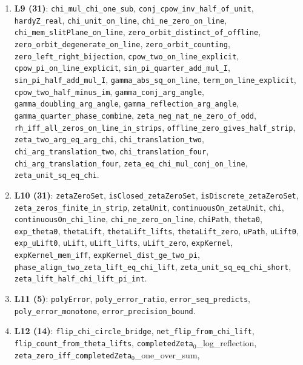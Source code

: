 \documentclass{article}
\begin{document}
{\begin{sloppypar}
\begin{enumerate}
\texttt{recip\_on\_critical\_circle\_iff}, \texttt{zero\_orbit\_four}.
\item \textbf{L9 (31)}: \texttt{chi\_mul\_chi\_one\_sub},
\texttt{conj\_cpow\_inv\_half\_of\_unit}, \texttt{hardyZ\_real},
\texttt{chi\_unit\_on\_line}, \texttt{chi\_ne\_zero\_on\_line},
\texttt{chi\_mem\_slitPlane\_on\_line}, \texttt{zero\_orbit\_distinct\_of\_offline},
\texttt{zero\_orbit\_degenerate\_on\_line}, \texttt{zero\_orbit\_counting},
\texttt{zero\_left\_right\_bijection}, \texttt{cpow\_two\_on\_line\_explicit},
\texttt{cpow\_pi\_on\_line\_explicit}, \texttt{sin\_pi\_quarter\_add\_mul\_I},
\texttt{sin\_pi\_half\_add\_mul\_I}, \texttt{gamma\_abs\_sq\_on\_line},
\texttt{term\_on\_line\_explicit}, \texttt{cpow\_two\_half\_minus\_im},
\texttt{gamma\_conj\_arg\_angle}, \texttt{gamma\_doubling\_arg\_angle},
\texttt{gamma\_reflection\_arg\_angle}, \texttt{gamma\_quarter\_phase\_combine},
\texttt{zeta\_neg\_nat\_ne\_zero\_of\_odd},
\texttt{rh\_iff\_all\_zeros\_on\_line\_in\_strips},
\texttt{offline\_zero\_gives\_half\_strip}, \texttt{zeta\_two\_arg\_eq\_arg\_chi},
\texttt{chi\_translation\_two}, \texttt{chi\_arg\_translation\_two},
\texttt{chi\_translation\_four}, \texttt{chi\_arg\_translation\_four},
\texttt{zeta\_eq\_chi\_mul\_conj\_on\_line}, \texttt{zeta\_unit\_sq\_eq\_chi}.
\item \textbf{L10 (31)}: \texttt{zetaZeroSet}, \texttt{isClosed\_zetaZeroSet},
\texttt{isDiscrete\_zetaZeroSet}, \texttt{zeta\_zeros\_finite\_in\_strip},
\texttt{zetaUnit}, \texttt{continuousOn\_zetaUnit}, \texttt{chi},
\texttt{continuousOn\_chi\_line}, \texttt{chi\_ne\_zero\_on\_line},
\texttt{chiPath}, \texttt{theta0}, \texttt{exp\_theta0}, \texttt{thetaLift},
\texttt{thetaLift\_lifts}, \texttt{thetaLift\_zero}, \texttt{uPath},
\texttt{uLift0}, \texttt{exp\_uLift0}, \texttt{uLift}, \texttt{uLift\_lifts},
\texttt{uLift\_zero}, \texttt{expKernel}, \texttt{expKernel\_mem\_iff},
\texttt{expKernel\_dist\_ge\_two\_pi},
\texttt{phase\_align\_two\_zeta\_lift\_eq\_chi\_lift},
\texttt{zeta\_unit\_sq\_eq\_chi\_short},
\texttt{zeta\_lift\_half\_chi\_lift\_pi\_int}.
\item \textbf{L11 (5)}: \texttt{polyError}, \texttt{poly\_error\_ratio},
\texttt{error\_seq\_predicts}, \texttt{poly\_error\_monotone},
\texttt{error\_precision\_bound}.
\item \textbf{L12 (14)}: \texttt{flip\_chi\_circle\_bridge},
\texttt{net\_flip\_from\_chi\_lift}, \texttt{flip\_count\_from\_theta\_lifts},
\texttt{completedZeta}\(_0\)\_log\_reflection,
\texttt{zeta\_zero\_iff\_completedZeta}\(_0\)\_one\_over\_sum,

\end{enumerate}
\end{sloppypar}}
\end{document}
